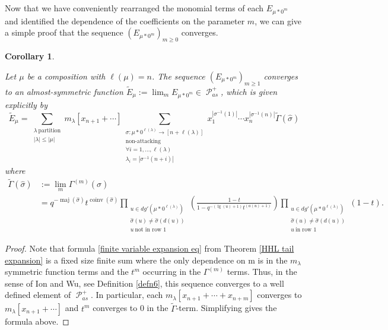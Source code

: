 \documentclass[11pt]{article}
\newtheorem{coro}[theo]{Corollary}
\theoremstyle{definition}
\numberwithin{equation}{section}
\DeclareMathOperator{\sP}{\mathscr{P} }
\DeclareMathOperator{\maj}{maj}
\DeclareMathOperator{\coinv}{coinv}
\DeclareMathOperator{\mathleg}{lg}
\begin{document}
Now that we have conveniently rearranged the monomial terms of each $E_{\mu*0^m}$ and identified the dependence of the coefficients on the parameter $m$, we can give a simple proof that the sequence $(E_{\mu*0^m})_{m \geq 0}$ converges.

\begin{coro}\label{convergence of macdonald}


Let $\mu$ be a composition with $\ell(\mu) = n$. The sequence $(E_{\mu * 0^m})_{m \geq 1}$ converges to an almost-symmetric function $\widetilde{E}_{\mu}:= \lim_{m} E_{\mu * 0^m} \in \sP_{as}^{+}$, which is given explicitly by 
\begin{equation}
       \widetilde{E}_{\mu} = 
        \sum_{\substack{\lambda ~ \text{partition}  \\ |\lambda| \leq |\mu|}} m_{\lambda}[x_{n+1}+ \cdots] \sum_{\substack{\sigma:\mu * 0^{\ell(\lambda)} \rightarrow [n+\ell(\lambda)]\\ \text{non-attacking} \\ \forall i = 1,\ldots,\ell(\lambda) \\ \lambda_i = |\sigma^{-1}(n+i)|}} x_1 ^{|\sigma^{-1}(1)|}\cdots x_n ^{|\sigma^{-1}(n)|} \widetilde{\Gamma}(\widehat{\sigma})
\end{equation}
%
where 
%
\begin{align*}
\widetilde{\Gamma}(\widehat{\sigma}) & := \lim_{m} \Gamma^{(m)}(\widehat{\sigma}) \\
&= q^{-\maj(\widehat{\sigma})}t^{\coinv(\widehat{\sigma})} \prod_{\substack{ u \in dg'(\mu * 0^{\ell(\lambda)}) \\ \widehat{\sigma}(u) \neq \widehat{\sigma}(d(u)) \\ u ~ \text{not in row } 1 }} \left( \frac{1-t}{1-q^{-(\mathleg(u)+1)}t^{(a(u)+1)}} \right) \prod_{\substack{ u \in dg'(\mu * 0^{\ell(\lambda)}) \\ \widehat{\sigma}(u) \neq \widehat{\sigma}(d(u)) \\ u ~ \text{in row } 1 }} \left( 1-t \right).
\end{align*}
\end{coro}


\begin{proof}
Note that formula \eqref{finite variable expansion eq} from Theorem \ref{HHL tail expansion} is a fixed size finite sum where the only dependence on m is in the $m_{\lambda}$ symmetric function terms and the $t^m$ occurring in the $\Gamma^{(m)}$ terms. Thus, in the sense of Ion and Wu, see Definition \ref{defn6}, this sequence converges to a well defined element of $\sP_{as}^{+}$. In particular, each $m_{\lambda}[x_{n+1}+\cdots +x_{n+m}]$ converges to $m_{\lambda}[x_{n+1}+ \cdots]$ and $t^m$ converges to 0 in the $\widetilde{\Gamma}$-term. Simplifying gives the formula above. 
\end{proof}
\end{document}
